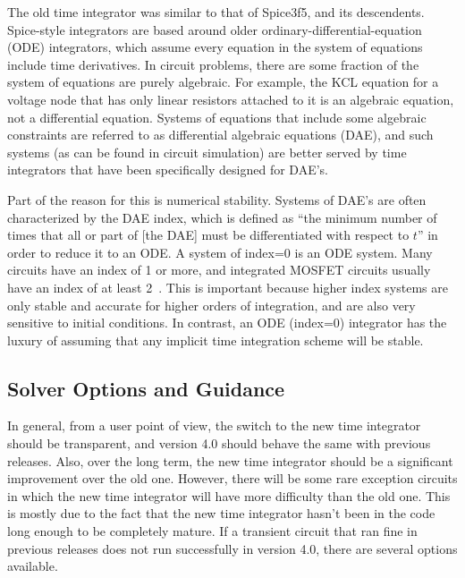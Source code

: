 The old time integrator was similar to that of Spice3f5, and its descendents.  Spice-style
integrators are based around older ordinary-differential-equation (ODE) 
integrators, which assume every equation in the system of equations include time derivatives.
In circuit problems, there are some fraction of the system of equations are purely algebraic.
For example, the KCL equation for a voltage node that has only linear resistors attached
to it is an algebraic equation, not a differential equation.  Systems of equations
that include some algebraic constraints are referred to as differential algebraic
equations (DAE), and such systems (as can be found in circuit simulation) are better served by 
time integrators that have been specifically designed for DAE's.  

Part of the reason for this is numerical stability.  Systems of DAE's are often characterized
by the DAE index, which is defined as ``the minimum number of times that all or part of [the DAE] 
must be differentiated with respect to $t$'' in order to reduce it to an ODE\cite{Petzold:1996}. 
A system of index=0 is an ODE system.  Many circuits have an index of 1 or more, and 
integrated MOSFET circuits usually have an index of at least 2~\cite{Brachtendorf1}.  This is important
because higher index systems are only stable and accurate for higher orders of 
integration, and are also very sensitive to initial conditions.
In contrast, an ODE (index=0) integrator has the luxury of assuming that any implicit 
time integration scheme will be stable.

\subsection{Solver Options and Guidance}

In general, from a user point of view, the switch to the new time integrator should be transparent,
and \Xyce{} version 4.0 should behave the same with previous \Xyce{} releases.  
Also, over the long term, the new time integrator should be a significant improvement over the old one.  
However, there
will be some rare exception circuits in which the new time integrator will have more difficulty than
the old one.  This is mostly due to the fact that the new time integrator hasn't been 
in the code long enough to be completely mature.  If a transient circuit that ran fine in previous 
releases does not run successfully in \Xyce{} version 4.0, there are several options available.


